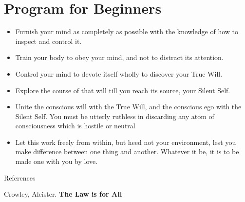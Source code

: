 \section{Program for Beginners}

\begin{itemize}
\item Furnish your mind as completely as possible with the knowledge of how to inspect and control it. 
\item Train your body to obey your mind, and not to distract its attention. 
\item Control your mind to devote itself wholly to discover your True Will. 
\item Explore the course of that will till you reach its source, your Silent Self. 
\item Unite the conscious will with the True Will, and the conscious ego with the Silent Self. You must be utterly ruthless in discarding any atom of consciousness which is hostile or neutral 
\item Let this work freely from within, but heed not your environment, lest you make difference between one thing and another. Whatever it be, it is to be made one with you by love. 
\end{itemize}

\hfill

References

Crowley, Aleister. \textbf{The Law is for All}



